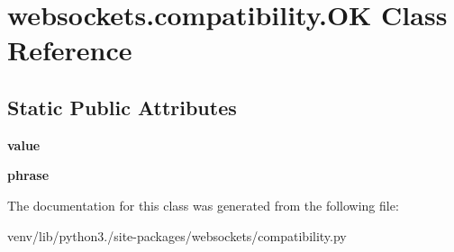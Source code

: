 \hypertarget{classwebsockets_1_1compatibility_1_1_o_k}{}\section{websockets.\+compatibility.\+OK Class Reference}
\label{classwebsockets_1_1compatibility_1_1_o_k}
\subsection*{Static Public Attributes}
\begin{DoxyCompactItemize}
\item 
\mbox{\label{classwebsockets_1_1compatibility_1_1_o_k_a93e5b7bbdbcc38e4aba556c1cc1ad9a5}} 
{\bfseries value}
\item 
\mbox{\label{classwebsockets_1_1compatibility_1_1_o_k_a15e5e3039ff59cd790d6e65cd5bb1563}} 
{\bfseries phrase}
\end{DoxyCompactItemize}


The documentation for this class was generated from the following file\+:\begin{DoxyCompactItemize}
\item 
venv/lib/python3./site-\/packages/websockets/compatibility.\+py\end{DoxyCompactItemize}
